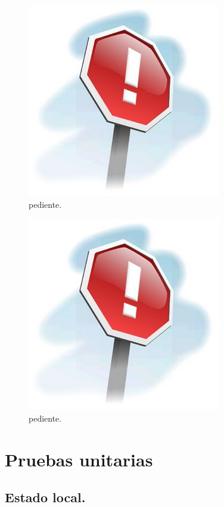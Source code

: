 \begin{figure}[ht]
	\centering
	\includegraphics[scale=.25]{./Figures/Capitulo4/pendiente.jpg}
	\caption{pediente.}
	\label{fig:disp_prim}
\end{figure}

\begin{figure}[ht]
	\centering
	\includegraphics[scale=.25]{./Figures/Capitulo4/pendiente.jpg}
	\caption{pediente.}
	\label{fig:disp_sec}
\end{figure}


\section{Pruebas unitarias}

\subsection{Estado local.}

